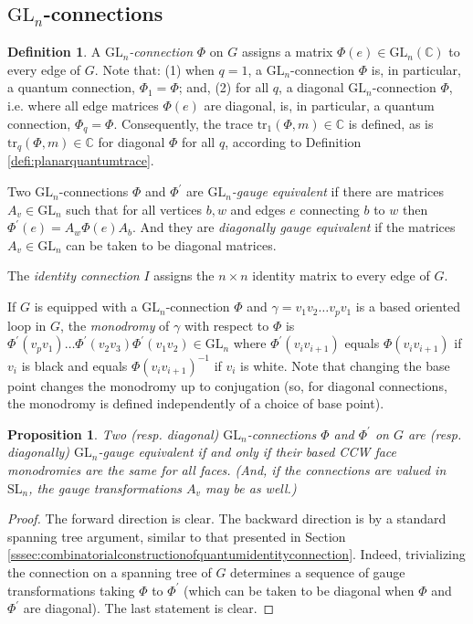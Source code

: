 \documentclass[12pt, reqno]{amsart}
\newtheorem{prop}[theo]{Proposition}
\theoremstyle{definition}
\newtheorem{defi}[theo]{Definition}
\newcommand{\trqc}{\mathrm{tr}_q}%
\newcommand{\GL}{\mathrm{GL}}%
\newcommand{\SL}{\mathrm{SL}}%
\begin{document}
\subsection{\texorpdfstring{$\GL_n$}{GLn}-connections}

\begin{defi}
A \emph{$\GL_n$-connection} $\Phi$ on $G$ assigns a matrix $\Phi(e)\in\GL_n(\mathbb{C})$ to every edge of $G$.  Note that:  (1)  when $q=1$, a $\GL_n$-connection $\Phi$ is, in particular, a quantum connection, $\Phi_1=\Phi$; and, (2) for all $q$, a diagonal $\GL_n$-connection $\Phi$, i.e. where all edge matrices $\Phi(e)$ are diagonal, is, in particular, a quantum connection, $\Phi_q=\Phi$.  Consequently, the trace $\mathrm{tr}_1(\Phi,m)\in\mathbb{C}$ is defined, as is $\trqc(\Phi,m)\in\mathbb{C}$ for diagonal $\Phi$ for all $q$, according to Definition \ref{defi:planarquantumtrace}.

Two $\GL_n$-connections $\Phi$ and $\Phi^\prime$ are \emph{$\GL_n$-gauge equivalent} if there are matrices $A_v\in\GL_n$ such that for all vertices $b,w$ and edges $e$ connecting $b$ to $w$ then $\Phi^\prime(e)=A_w\Phi(e)A_b$.  And they are \emph{diagonally gauge equivalent} if the matrices $A_v\in\GL_n$ can be taken to be diagonal matrices.

The \emph{identity connection} $I$ assigns the $n\times n$ identity matrix to every edge of $G$.

If $G$ is equipped with a $\GL_n$-connection $\Phi$ and $\gamma=v_1v_2\dots v_p v_1$ is a based oriented loop in $G$, the \emph{monodromy} of $\gamma$ with respect to $\Phi$ is $\Phi^\prime(v_p v_1)\dots\Phi^\prime(v_2v_3)\Phi^\prime(v_1v_2)\in\GL_n$ where $\Phi^\prime(v_i v_{i+1})$ equals $\Phi(v_i v_{i+1})$ if $v_i$ is black and equals $\Phi(v_i v_{i+1})^{-1}$ if $v_i$ is white.  Note that changing the base point changes the monodromy up to conjugation (so, for diagonal connections, the monodromy is defined independently of a choice of base point).
\end{defi}

\begin{prop}\label{prop:diagonalgaugeequivalence}
Two (resp. diagonal) $\GL_n$-connections $\Phi$ and $\Phi^\prime$ on $G$ are (resp. diagonally) $\GL_n$-gauge equivalent if and only if their based CCW face monodromies are the same for all faces.  (And, if the connections are valued in $\SL_n$, the gauge transformations $A_v$ may be as well.)
\end{prop}

\begin{proof}
The forward direction is clear.  The backward direction is by a standard spanning tree argument, similar to that presented in Section \ref{sssec:combinatorialconstructionofquantumidentityconnection}.  Indeed, trivializing the connection on a spanning tree of $G$ determines a sequence of gauge transformations taking $\Phi$ to $\Phi^\prime$ (which can be taken to be diagonal when $\Phi$ and $\Phi^\prime$ are diagonal).  The last statement is clear.
\end{proof}
\end{document}
